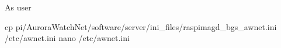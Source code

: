 As user \rootUser
\begin{Cmd}[fontsize=\relsize{-1.75}]
cp \mytilde{}pi/AuroraWatchNet/software/server/ini_files/raspimagd_bgs_awnet.ini /etc/awnet.ini
nano /etc/awnet.ini
\end{Cmd}


